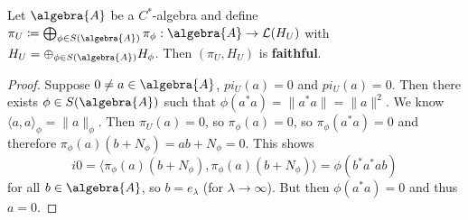 \documentclass[a4paper]{article}
\begin{document}
\begin{theorem}
	Let $\algebra{A}$ be a $C^*$-algebra and define $\pi_U \coloneq \bigoplus_{\phi \in S(\algebra{A})} \pi_\phi: \algebra{A} \to \mathcal{L}(H_U)$ with $H_U = \oplus_{\phi \in S(\algebra{A})} H_\phi$.
	Then $(\pi_U, H_U)$ is \textbf{faithful}.
\end{theorem}

\begin{proof}
	Suppose $0 \neq a \in \algebra{A}$, $pi_U(a) = 0$ and $pi_U(a) = 0$.
	Then there exists $\phi \in S(\algebra{A})$ such that $\phi(a^* a) = \|a^* 
	a\| = \|a\|^2$.
	We know $\langle a, a \rangle_\phi = \|a\|_\phi$.
	Then $\pi_U(a) = 0$, so $\pi_\phi(a) = 0$, so $\pi_\phi(a^*a) = 0$ and therefore $\pi_\phi(a)(b + N_\phi) = ab + N_\phi = 0$.
	This shows 
	\begin{equation*}
	i	0 = \langle \pi_\phi(a) (b + N_\phi), \pi_\phi(a)(b + N_\phi) \rangle = \phi(b^* a^* a b)
	\end{equation*}
	for all $b \in \algebra{A}$, so $b = e_\lambda$ (for $\lambda \to \infty$).
	But then $\phi(a^* a) = 0$ and thus $a = 0$.

\end{proof}
\end{document}
